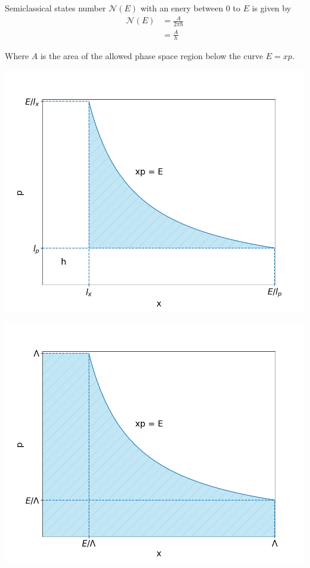 \documentclass[12pt]{report}
\newcommand*{\1}{\hspace{1pt}}
\begin{document}
    Semiclassical states number $\mathcal {N}(E)$ with an enery between $0$ to $E$ is given by
    \begin{equation}
        \begin{split}
            \mathcal {N}(E) &= \frac{A}{2 \pi \hbar} \\
            &= \frac{A}{h}
        \end{split}
    \end{equation}

    Where $A$ is the area of the allowed phase space region below the curve $E = xp$.

    \begin{adjustbox}{center,caption={Berry-Keating Regularization},label={microcanocnial OTOC},nofloat=figure,}
        \includegraphics[width=\textwidth]{pic4}
    \end{adjustbox}

    \begin{adjustbox}{center,caption={Connes Regularization},label={microcanocnial OTOC},nofloat=figure,}
        \includegraphics[width=\textwidth]{pic3}
    \end{adjustbox}
\end{document}
